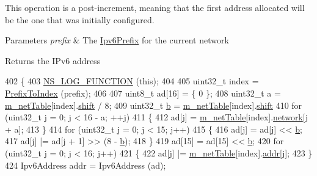 This operation is a post-\/increment, meaning that the first address allocated will be the one that was initially configured.


\begin{DoxyParams}{Parameters}
{\em prefix} & The \hyperlink{classns3_1_1Ipv6Prefix}{Ipv6\+Prefix} for the current network \\
\hline
\end{DoxyParams}
\begin{DoxyReturn}{Returns}
the I\+Pv6 address 
\end{DoxyReturn}

\begin{DoxyCode}
402 \{
403   \hyperlink{log-macros-disabled_8h_a90b90d5bad1f39cb1b64923ea94c0761}{NS\_LOG\_FUNCTION} (\textcolor{keyword}{this});
404 
405   uint32\_t index = \hyperlink{classns3_1_1Ipv6AddressGeneratorImpl_a0dbdd6e1547463c189a0e82251557e44}{PrefixToIndex} (prefix);
406 
407   uint8\_t ad[16] = \{ 0 \};
408   uint32\_t a = \hyperlink{classns3_1_1Ipv6AddressGeneratorImpl_a4b742848bb716936009880a429664323}{m\_netTable}[index].\hyperlink{classns3_1_1Ipv6AddressGeneratorImpl_1_1NetworkState_a959c55b3a4900a71975f7f5ea3b2d859}{shift} / 8;
409   uint32\_t \hyperlink{buildings__pathloss_8m_a21ad0bd836b90d08f4cf640b4c298e7c}{b} = \hyperlink{classns3_1_1Ipv6AddressGeneratorImpl_a4b742848bb716936009880a429664323}{m\_netTable}[index].\hyperlink{classns3_1_1Ipv6AddressGeneratorImpl_1_1NetworkState_a959c55b3a4900a71975f7f5ea3b2d859}{shift} %
410   \textcolor{keywordflow}{for} (uint32\_t j = 0; j < 16 - a; ++j)
411     \{
412       ad[j] = \hyperlink{classns3_1_1Ipv6AddressGeneratorImpl_a4b742848bb716936009880a429664323}{m\_netTable}[index].\hyperlink{classns3_1_1Ipv6AddressGeneratorImpl_1_1NetworkState_ac84710d199384c02e953fd604fe34cee}{network}[j + a];
413     \}
414   \textcolor{keywordflow}{for} (uint32\_t j = 0; j < 15; j++)
415     \{
416       ad[j] = ad[j] << \hyperlink{buildings__pathloss_8m_a21ad0bd836b90d08f4cf640b4c298e7c}{b};
417       ad[j] |= ad[j + 1] >> (8 - \hyperlink{buildings__pathloss_8m_a21ad0bd836b90d08f4cf640b4c298e7c}{b});
418     \}
419   ad[15] = ad[15] << \hyperlink{buildings__pathloss_8m_a21ad0bd836b90d08f4cf640b4c298e7c}{b};
420   \textcolor{keywordflow}{for} (uint32\_t j = 0; j < 16; j++)
421     \{
422       ad[j] |= \hyperlink{classns3_1_1Ipv6AddressGeneratorImpl_a4b742848bb716936009880a429664323}{m\_netTable}[index].\hyperlink{classns3_1_1Ipv6AddressGeneratorImpl_1_1NetworkState_ac4a604c7422c65bab24ad2dc003d0316}{addr}[j];
423     \}
424   Ipv6Address addr = Ipv6Address (ad);

\end{DoxyCode}
